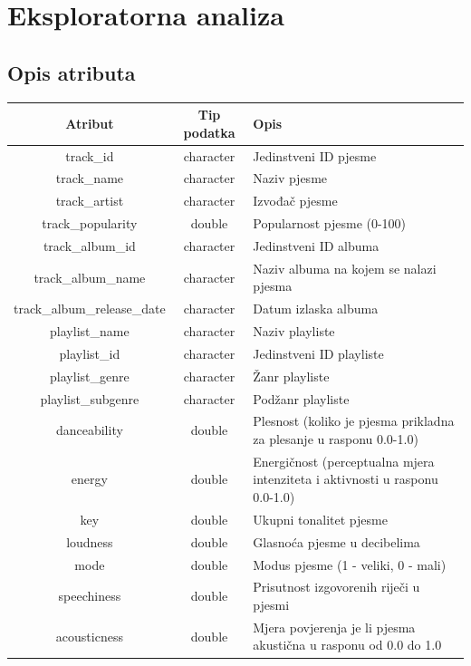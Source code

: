 \chapter{Eksploratorna analiza}

\section{Opis atributa}
\begin{table}[h]
	\centering
	\begin{tabular}{|c|c|p{8cm}|}
	\hline
	\textbf{Atribut} & \textbf{Tip podatka} & \textbf{Opis} \\ \hline
	track\_id & character & Jedinstveni ID pjesme \\ \hline
	track\_name & character & Naziv pjesme \\ \hline
	track\_artist & character & Izvođač pjesme \\ \hline
	track\_popularity & double & Popularnost pjesme (0-100) \\ \hline
	track\_album\_id & character & Jedinstveni ID albuma \\ \hline
	track\_album\_name & character & Naziv albuma na kojem se nalazi pjesma \\ \hline
	track\_album\_release\_date & character & Datum izlaska albuma \\ \hline
	playlist\_name & character & Naziv playliste \\ \hline
	playlist\_id & character & Jedinstveni ID playliste \\ \hline
	playlist\_genre & character & Žanr playliste \\ \hline
	playlist\_subgenre & character & Podžanr playliste \\ \hline
	danceability & double & Plesnost (koliko je pjesma prikladna za plesanje u rasponu 0.0-1.0) \\ \hline
	energy & double & Energičnost (perceptualna mjera intenziteta i aktivnosti u rasponu 0.0-1.0) \\ \hline
	key & double & Ukupni tonalitet pjesme \\ \hline
	loudness & double & Glasnoća pjesme u decibelima \\ \hline
	mode & double & Modus pjesme (1 - veliki, 0 - mali) \\ \hline
	speechiness & double & Prisutnost izgovorenih riječi u pjesmi \\ \hline
	acousticness & double & Mjera povjerenja je li pjesma akustična u rasponu od 0.0 do 1.0 \\ \hline

\end{tabular}
\end{table}
